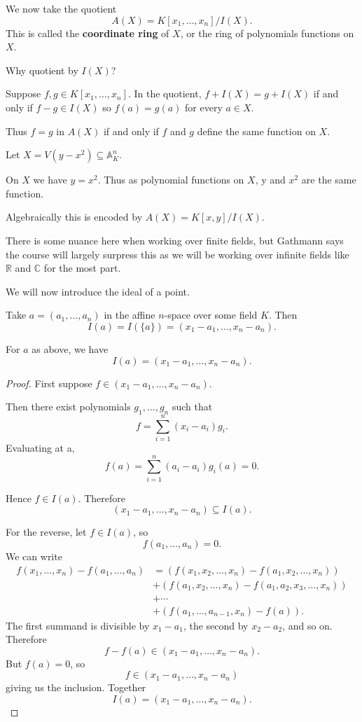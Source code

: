 \documentclass[11pt]{article}
\begin{document}
We now take the quotient 
\[
    A(X) = K[x_1,\ldots,x_n]/I(X). 
\]
This is called the \textbf{coordinate ring} of $X$, or 
the ring of polynomials functions on $X$. 

Why quotient by $I(X)$? 

Suppose $f,g \in K[x_1,\ldots,x_n]$. 
In the quotient, $f + I(X) = g + I(X)$ if and only if 
$f-g \in I(X)$ so $f(a) = g(a)$ for every $a\in X$. 

Thus $f=g$ in $A(X)$ if and only if $f$ and $g$ define the 
same function on $X$. 

\begin{ex}
    Let $X = V(y-x^2) \subseteq \mathbb A^n_K$. 
    
    On $X$ we have $y = x^2$. Thus as polynomial functions on 
    $X$, y and $x^2$ are the same function. 
    
    Algebraically this is encoded by $A(X) = K[x,y]/I(X)$. 
\end{ex}  

There is some nuance here when working over finite fields, 
but Gathmann says the course will largely 
surpress this as we will be working over infinite fields 
like $\mathbb R$ and $\mathbb C$ for the most part. 

We will now introduce the ideal of a point. 

Take $a = (a_1,\ldots,a_n)$ in the affine $n$-space over some 
field $K$. Then 
\[
    I(a) = I(\{a\}) 
    = (x_1 - a_1, \ldots, x_n - a_n). 
\]

\begin{prop}
    For $a$ as above, we have 
    \[
        I(a) = (x_1 - a_1, \ldots, x_n - a_n). 
    \]
\end{prop}
\begin{proof}
    First suppose $f \in (x_1 - a_1, \ldots, x_n - a_n)$. 

    Then there exist polynomials $g_1,\ldots,g_n$ such that 
    \[
        f = \sum_{i=1}^n (x_i - a_i)g_i. 
    \]
    Evaluating at a, 
    \[
        f(a) = \sum_{i=1}^n (a_i - a_i)g_i(a) = 0. 
    \]

    Hence $f \in I(a)$. 
    Therefore 
    \[
        (x_1 - a_1,\ldots,x_n - a_n) \subseteq I(a). 
    \]

    For the reverse, let $f \in I(a)$, so 
    \[
        f(a_1,\ldots,a_n) = 0. 
    \]
    We can write 
    \begin{align*}
        f(x_1,\ldots,x_n) - f(a_1,\ldots,a_n)
        &= (f(x_1, x_2,\ldots,x_n) - f(a_1,x_2,\ldots,x_n)) \\ 
        &+ (f(a_1,x_2, \ldots, x_n) - f(a_1, a_2, x_3, \ldots, x_n)) \\ 
        &+ \cdots \\
        &+ (f(a_1,\ldots,a_{n-1},x_n) - f(a)). 
    \end{align*}
    The first summand is divisible by $x_1 - a_1$, the second 
    by $x_2 - a_2$, and so on. 
    Therefore 
    \[ 
        f - f(a) \in (x_1 - a_1, \ldots, x_n - a_n). 
    \]
    But $f(a) = 0$, so 
    \[ 
        f \in (x_1-a_1, \ldots, x_n - a_n)
    \]
    giving us the inclusion. 
    Together 
    \[
        I(a) = (x_1-a_1,\ldots,x_n - a_n).
    \]

\end{proof}
\end{document}
